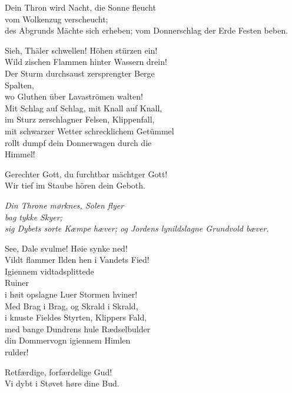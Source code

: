 \documentclass[shorttitlesize=45,tocstyle=ref]{ees}
\begin{document}
{\begin{multicols}{2}
Dein Thron wird Nacht, die Sonne fleucht\\
vom Wolkenzug verscheucht;\\
des Abgrunds Mächte sich erheben;
vom Donnerschlag der Erde Festen beben.

Sieh, Thäler schwellen! Höhen stürzen ein!\\
Wild zischen Flammen hinter Wassern drein!\\
Der Sturm durchsaust zersprengter Berge\\
\hspace*{1em}Spalten,\\
wo Gluthen über Lavaströmen walten!\\
Mit Schlag auf Schlag, mit Knall auf Knall,\\
im Sturz zerschlagner Felsen, Klippenfall,\\
mit schwarzer Wetter schrecklichem Getümmel\\
rollt dumpf dein Donnerwagen durch die\\
\hspace*{1em}Himmel!

Gerechter Gott, du furchtbar mächtger Gott!\\
Wir tief im Staube hören dein Geboth.

\columnbreak\itshape
Din Throne mørknes, Solen flyer\\
bag tykke Skyer;\\
sig Dybets sorte Kæmpe hæver;
og Jordens lynildslagne Grundvold bæver.

See, Dale svulme! Høie synke ned!\\
Vildt flammer Ilden hen i Vandets Fied!\\
Igiennem vidtadsplittede\\
\hspace*{1em}Ruiner\\
i høit opslagne Luer Stormen hviner!\\
Med Brag i Brag, og Skrald i Skrald,\\
i knuste Fieldes Styrten, Klippers Fald,\\
med bange Dundrens hule Rædselbulder\\
din Dommervogn igiennem Himlen\\
\hspace*{1em}rulder!

Retfærdige, forfærdelige Gud!\\
Vi dybt i Støvet høre dine Bud.
\end{multicols}

}
\end{document}
